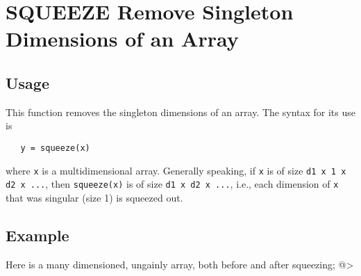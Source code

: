 \section{SQUEEZE Remove Singleton Dimensions of an Array}

\subsection{Usage}

This function removes the singleton dimensions of an array.  The
syntax for its use is
\begin{verbatim}
   y = squeeze(x)
\end{verbatim}
where \verb|x| is a multidimensional array.  Generally speaking, if
\verb|x| is of size \verb|d1 x 1 x d2 x ...|, then \verb|squeeze(x)| is of
size \verb|d1 x d2 x ...|, i.e., each dimension of \verb|x| that was
singular (size 1) is squeezed out.
\subsection{Example}

Here is a many dimensioned, ungainly array, both before and 
after squeezing;
@>
